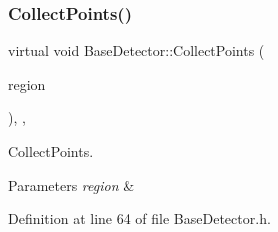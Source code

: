 \subsubsection{\texorpdfstring{Collect\+Points()}{CollectPoints()}}
{\footnotesize\ttfamily virtual void Base\+Detector\+::\+Collect\+Points (\begin{DoxyParamCaption}\item[{\mbox{\hyperlink{class_c_region}{C\+Region}} \&}]{region }\end{DoxyParamCaption})\hspace{0.3cm}{\ttfamily [inline]}, {\ttfamily [virtual]}, {\ttfamily [inherited]}}



Collect\+Points. 


\begin{DoxyParams}{Parameters}
{\em region} & \\
\hline
\end{DoxyParams}


Definition at line 64 of file Base\+Detector.\+h.



